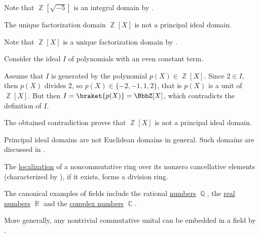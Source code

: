 \begin{example}
\begin{refenum}
    Note that \( \BbbZ[\sqrt{-5}] \) is an integral domain by .

    \cite{ProofWiki:polynomials_in_integers_is_not_principal_ideal_domain} The unique factorization domain \( \BbbZ[X] \) is not a principal ideal domain.

    Note that \( \BbbZ[X] \) is a unique factorization domain by .

    Consider the ideal \( I \) of polynomials with an even constant term.

    Assume that \( I \) is generated by the polynomial \( p(X) \in \BbbZ[X] \). Since \( 2 \in I \), then \( p(X) \) divides \( 2 \), so \( p(X) \in \{ -2, -1, 1, 2 \} \), that is \( p(X) \) is a unit of \( \BbbZ[X] \). But then \( I = \braket{p(X)} = \BbbZ[X] \), which contradicts the definition of \( I \).

    The obtained contradiction proves that \( \BbbZ[X] \) is not a principal ideal domain.

     Principal ideal domains are not Euclidean domains in general. Such domains are discussed in \cite{Anderson1988}.

     The \hyperref[def:ring_localization]{localization} of a noncommutative ring over its nonzero cancellative elements (characterized by ), if it exists, forms a division ring.

     The canonical examples of fields include the rational \hyperref[def:rational_numbers]{numbers} \( \BbbQ \), the \hyperref[def:set_of_real_numbers]{real numbers} \( \BbbR \) and the \hyperref[def:complex_numbers]{complex numbers} \( \BbbC \).

    More generally, any nontrivial commutative unital can be embedded in a field by .
  \end{refenum}
\end{example}

